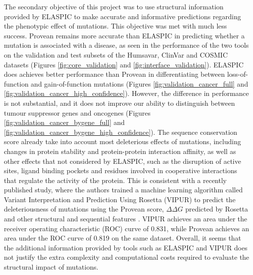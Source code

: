 The secondary objective of this project was to use structural information provided by ELASPIC to make accurate and informative predictions regarding the phenotypic effect of mutations. This objective was met with much less success. Provean remains more accurate than ELASPIC in predicting whether a mutation is associated with a disease, as seen in the performance of the two tools on the validation and test subsets of the Humsavar, ClinVar and COSMIC datasets (Figures \ref{fig:core_validation} and \ref{fig:interface_validation}). ELASPIC does achieves better performance than Provean in differentiating between loss-of-function and gain-of-function mutations (Figures \ref{fig:validation_cancer_full} and \ref{fig:validation_cancer_high_confidence}). However, the difference in performance is not substantial, and it does not improve our ability to distinguish between tumour suppressor genes and oncogenes (Figures \ref{fig:validation_cancer_bygene_full} and \ref{fig:validation_cancer_bygene_high_confidence}). The sequence conservation score already take into account most deleterious effects of mutations, including changes in protein stability and protein-protein interaction affinity, as well as other effects that not considered by ELASPIC, such as the disruption of active sites, ligand binding pockets and residues involved in cooperative interactions that regulate the activity of the protein. This is consistent with a recently published study, where the authors trained a machine learning algorithm called Variant Interpretation and Prediction Using Rosetta (VIPUR) to predict the deleteriousness of mutations using the Provean score, $\Delta \Delta G$ predicted by Rosetta and other structural and sequential features \cite{baugh_robust_2016}. VIPUR achieves an area under the receiver operating characteristic (ROC) curve of 0.831, while Provean achieves an area under the ROC curve of 0.819 on the same dataset. Overall, it seems that the additional information provided by tools such as ELASPIC and VIPUR does not justify the extra complexity and computational costs required to evaluate the structural impact of mutations.

